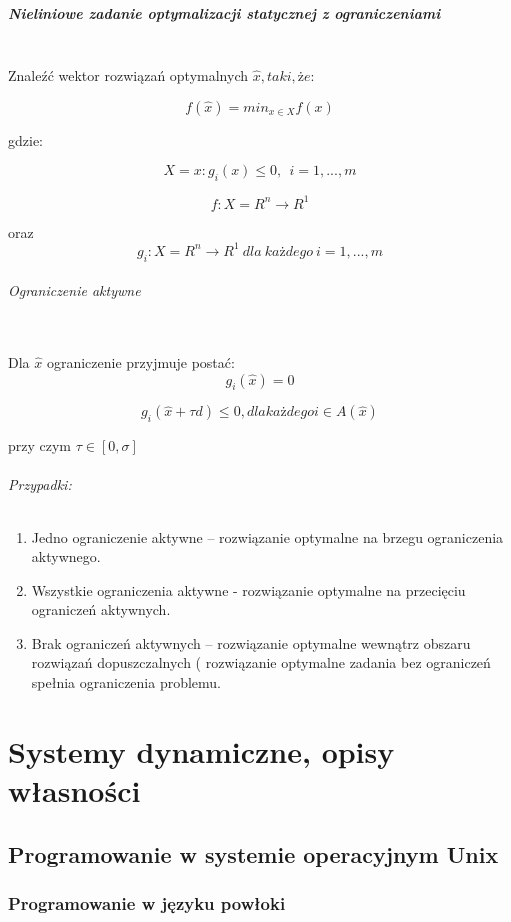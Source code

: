 \documentclass[a4paper,twoside]{report}
\begin{document}
\paragraph{Nieliniowe zadanie optymalizacji statycznej z ograniczeniami\\\\}
Znaleźć wektor rozwiązań optymalnych $\hat{x}, taki, że:$

$$f(\hat{x})=min_{x \in X}f(x)$$

gdzie:

$$X={x:g_i(x) \le 0,~~i=1,...,m}$$

$$f:X = R^n \longrightarrow R^1$$

oraz $$g_i:X = R^n \longrightarrow R^1~dla~każdego~i=1,...,m$$

\subparagraph{Ograniczenie aktywne\\\\}

Dla $\hat{x}$ ograniczenie przyjmuje postać:
\[  g_i(\hat{x})=0 \]


$$ g_i(\hat{x}+\tau d) \le 0, dla każdego i \in A(\hat{x})$$

przy czym $\tau \in [0,\sigma]$



\subparagraph{Przypadki:}

\begin{enumerate}

\item Jedno ograniczenie aktywne – rozwiązanie optymalne na brzegu ograniczenia
aktywnego.
\item Wszystkie ograniczenia aktywne - rozwiązanie optymalne na przecięciu ograniczeń
aktywnych.
\item Brak ograniczeń aktywnych – rozwiązanie optymalne wewnątrz obszaru rozwiązań
dopuszczalnych ( rozwiązanie optymalne zadania bez ograniczeń spełnia
ograniczenia problemu.

\end{enumerate}

\chapter{Systemy dynamiczne, opisy własności}
\section{Programowanie w systemie operacyjnym Unix}
\subsection{Programowanie w języku powłoki}
\end{document}
